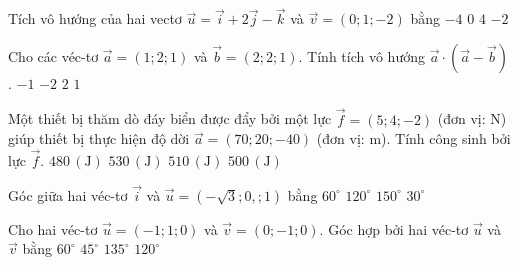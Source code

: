 \begin{ex}
	Tích vô hướng của hai vectơ $\vec{u} = \vec{i} + 2 \vec{j} - \vec{k}$ và $ \vec{v} = (0;1; -2)$ bằng
	\choice
	{$ -4 $}
	{$ 0 $}
	{\True $ 4 $}
	{$ -2 $}
\end{ex} 


\begin{ex}
	Cho các véc-tơ $\vec{a}=(1;2;1)$ và $\vec{b}=(2;2;1)$. Tính tích vô hướng $\vec{a} \cdot \left(\vec{a}-\vec{b}\right)$.
	\choice
	{\True $-1$}
	{$-2$}
	{$2$}
	{$1$}
\end{ex} 

\begin{ex}
	Một thiết bị thăm dò đáy biển được đẩy bởi một lực $\overrightarrow{f} = (5; 4; -2)$ (đơn vị: N) giúp thiết bị thực hiện độ dời $\overrightarrow{a} = (70; 20; -40)$ (đơn vị: m). Tính công sinh bởi lực $\overrightarrow{f}$.
	\choice
	{$480\,(\text{J})$}
	{$530\,(\text{J})$}
	{\True $510\,(\text{J})$}
	{$500\,(\text{J})$}
\end{ex} 

\begin{ex}
	Góc giữa hai véc-tơ $ \vec{i} $ và $ \vec{u}=(-\sqrt{3};0,;1) $ bằng
	\choice
	{$ 60^\circ $}
	{$ 120^\circ $}
	{\True $ 150^\circ $}
	{$ 30^\circ $}
\end{ex} 

\begin{ex}
	Cho hai véc-tơ $ \vec{u}=(-1;1;0) $ và $ \vec{v}=(0;-1;0) $. Góc hợp bởi hai véc-tơ $ \vec{u} $ và $ \vec{v} $ bằng
	\choice
	{$ 60^\circ $}
	{$ 45^\circ $}
	{\True $ 135^\circ $}
	{$ 120^\circ $}
\end{ex} 

